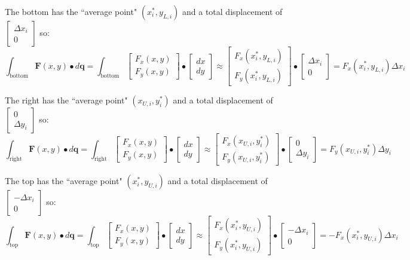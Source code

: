 \documentclass{article}
\begin{document}
The bottom has the ``average point" \((x_i^*, y_{L,i})\) and a total displacement of \(\begin{bmatrix} \Delta x_i \\ 0 \end{bmatrix}\) so: 
\[\int_{\text{bottom}} \mathbf{F}(x,y) \bullet d\mathbf{q} = \int_{\text{bottom}} \begin{bmatrix} F_x(x,y) \\ F_y(x,y) \end{bmatrix} \bullet \begin{bmatrix} dx \\ dy \end{bmatrix} \approx \begin{bmatrix} F_x(x_i^*, y_{L,i}) \\ F_y(x_i^*, y_{L,i}) \end{bmatrix} \bullet \begin{bmatrix} \Delta x_i \\ 0 \end{bmatrix} = F_x(x_i^*, y_{L,i}) \Delta x_i\]

The right has the ``average point" \((x_{U,i}, y_i^*)\) and a total displacement of \(\begin{bmatrix} 0 \\ \Delta y_i \end{bmatrix}\) so: 
\[\int_{\text{right}} \mathbf{F}(x,y) \bullet d\mathbf{q} = \int_{\text{right}} \begin{bmatrix} F_x(x,y) \\ F_y(x,y) \end{bmatrix} \bullet \begin{bmatrix} dx \\ dy \end{bmatrix} \approx \begin{bmatrix} F_x(x_{U,i}, y_i^*) \\ F_y(x_{U,i}, y_i^*) \end{bmatrix} \bullet \begin{bmatrix} 0 \\ \Delta y_i \end{bmatrix} = F_y(x_{U,i}, y_i^*) \Delta y_i\]

The top has the ``average point" \((x_i^*, y_{U,i})\) and a total displacement of \(\begin{bmatrix} -\Delta x_i \\ 0 \end{bmatrix}\) so: 
\[\int_{\text{top}} \mathbf{F}(x,y) \bullet d\mathbf{q} = \int_{\text{top}} \begin{bmatrix} F_x(x,y) \\ F_y(x,y) \end{bmatrix} \bullet \begin{bmatrix} dx \\ dy \end{bmatrix} \approx \begin{bmatrix} F_x(x_i^*, y_{U,i}) \\ F_y(x_i^*, y_{U,i}) \end{bmatrix} \bullet \begin{bmatrix} -\Delta x_i \\ 0 \end{bmatrix} = -F_x(x_i^*, y_{U,i}) \Delta x_i\]
\end{document}
